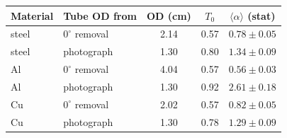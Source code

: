 \begin{tabular}{llccc}
\hline\hline
Material & Tube OD from & OD (cm) & $T_0$ & $\langle\alpha\rangle$ (stat)\\
\hline
steel & $0^\circ$ removal & 2.14 & 0.57 & $0.78\pm0.05$\\
steel & photograph & 1.30 & 0.80 & $1.34\pm0.09$\\
Al & $0^\circ$ removal & 4.04 & 0.57 & $0.56\pm0.03$\\
Al & photograph & 1.30 & 0.92 & $2.61\pm0.18$\\
Cu & $0^\circ$ removal & 2.02 & 0.57 & $0.82\pm0.05$\\
Cu & photograph & 1.30 & 0.78 & $1.29\pm0.09$\\
\hline\hline
\end{tabular}
